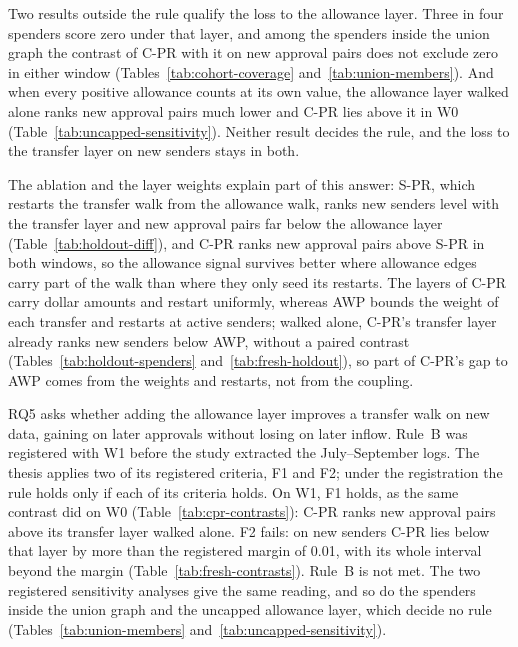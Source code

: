 Two results outside the rule qualify the loss to the allowance layer. Three in four spenders score zero under that layer, and among the spenders inside the union graph the contrast of \mbox{C-PR} with it on new approval pairs does not exclude zero in either window (Tables~\ref{tab:cohort-coverage} and~\ref{tab:union-members}). And when every positive allowance counts at its own value, the allowance layer walked alone ranks new approval pairs much lower and \mbox{C-PR} lies above it in W0 (Table~\ref{tab:uncapped-sensitivity}). Neither result decides the rule, and the loss to the transfer layer on new senders stays in both.

The ablation and the layer weights explain part of this answer: \mbox{S-PR}, which restarts the transfer walk from the allowance walk, ranks new senders level with the transfer layer and new approval pairs far below the allowance layer (Table~\ref{tab:holdout-diff}), and \mbox{C-PR} ranks new approval pairs above \mbox{S-PR} in both windows, so the allowance signal survives better where allowance edges carry part of the walk than where they only seed its restarts. The layers of \mbox{C-PR} carry dollar amounts and restart uniformly, whereas AWP bounds the weight of each transfer and restarts at active senders; walked alone, \mbox{C-PR}'s transfer layer already ranks new senders below AWP, without a paired contrast (Tables~\ref{tab:holdout-spenders} and~\ref{tab:fresh-holdout}), so part of \mbox{C-PR}'s gap to AWP comes from the weights and restarts, not from the coupling.


RQ5 asks whether adding the allowance layer improves a transfer walk on new data, gaining on later approvals without losing on later inflow. Rule~B was registered with W1 before the study extracted the July--September logs. The thesis applies two of its registered criteria, F1 and F2; under the registration the rule holds only if each of its criteria holds. On W1, F1 holds, as the same contrast did on W0 (Table~\ref{tab:cpr-contrasts}): \mbox{C-PR} ranks new approval pairs above its transfer layer walked alone. F2 fails: on new senders \mbox{C-PR} lies below that layer by more than the registered margin of 0.01, with its whole interval beyond the margin (Table~\ref{tab:fresh-contrasts}). Rule~B is not met. The two registered sensitivity analyses give the same reading, and so do the spenders inside the union graph and the uncapped allowance layer, which decide no rule (Tables~\ref{tab:union-members} and~\ref{tab:uncapped-sensitivity}).

